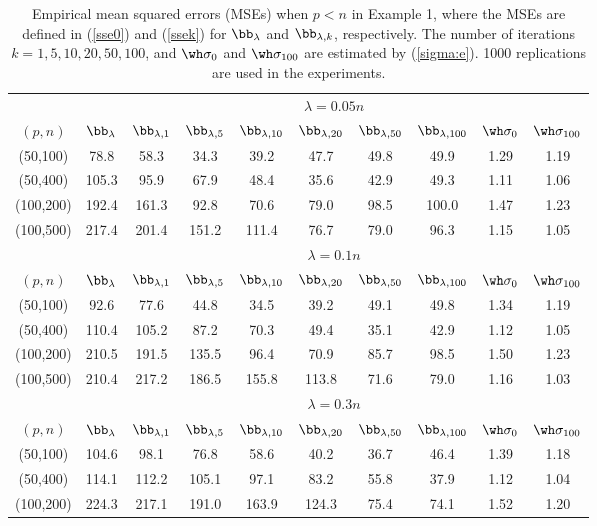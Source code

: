 \begin{table}[htp]
\caption{ Empirical mean squared errors (MSEs) when $p<n$ in Example 1, where the MSEs are defined in (\ref{sse0}) and (\ref{ssek}) for $\bb_{\lambda}$ and $\bb_{\lambda,k}$, respectively. The number of iterations $k=1,5,10,20,50,100$, and $\wh\sigma_0$ and $\wh\sigma_{100}$ are estimated by (\ref{sigma:e}). 1000 replications are used in the experiments.} 
          \label{Table-a1}
{\begin{center}
\begin{tabular}{cccccccccc}
\toprule
&\multicolumn{9}{c}{$\lambda=0.05n$}\\
\cline{2-10}
$(p,n)$&$\bb_{\lambda}$&$\bb_{\lambda,1}$&$\bb_{\lambda,5}$&$\bb_{\lambda,10}$&$\bb_{\lambda,20}$&$\bb_{\lambda,50}$&$\bb_{\lambda,100}$&$\wh\sigma_0$&$\wh\sigma_{100}$\\
\hline
(50,100)&78.8&58.3&34.3&39.2&47.7&49.8&49.9&1.29&1.19\\
(50,400)&105.3&95.9&67.9&48.4&35.6&42.9&49.3&1.11&1.06\\
(100,200)&192.4&161.3&92.8&70.6&79.0&98.5&100.0&1.47&1.23\\
(100,500)&217.4&201.4&151.2&111.4&76.7&79.0&96.3&1.15&1.05\\
\midrule
&\multicolumn{9}{c}{$\lambda=0.1n$}\\
\cline{2-10}
$(p,n)$&$\bb_{\lambda}$&$\bb_{\lambda,1}$&$\bb_{\lambda,5}$&$\bb_{\lambda,10}$&$\bb_{\lambda,20}$&$\bb_{\lambda,50}$&$\bb_{\lambda,100}$&$\wh\sigma_0$&$\wh\sigma_{100}$\\
\hline
(50,100)&92.6&77.6&44.8&34.5&39.2&49.1&49.8&1.34&1.19\\
(50,400)&110.4&105.2&87.2&70.3&49.4&35.1&42.9&1.12&1.05\\
(100,200)&210.5&191.5&135.5&96.4&70.9&85.7&98.5&1.50&1.23\\
(100,500)&210.4&217.2&186.5&155.8&113.8&71.6&79.0&1.16&1.03\\
\midrule
&\multicolumn{9}{c}{$\lambda=0.3n$}\\
\cline{2-10}
$(p,n)$&$\bb_{\lambda}$&$\bb_{\lambda,1}$&$\bb_{\lambda,5}$&$\bb_{\lambda,10}$&$\bb_{\lambda,20}$&$\bb_{\lambda,50}$&$\bb_{\lambda,100}$&$\wh\sigma_0$&$\wh\sigma_{100}$\\
\hline
(50,100)&104.6&98.1&76.8&58.6&40.2&36.7&46.4&1.39&1.18\\
(50,400)&114.1&112.2&105.1&97.1&83.2&55.8&37.9&1.12&1.04\\
(100,200)&224.3&217.1&191.0&163.9&124.3&75.4&74.1&1.52&1.20\\

\end{tabular}
\end{center}}
\end{table}

